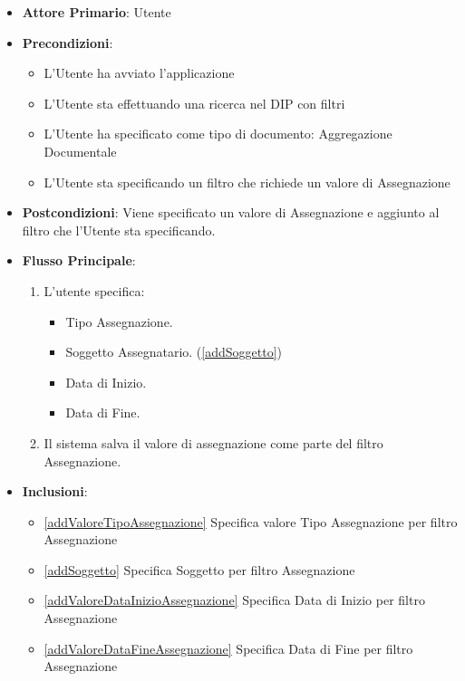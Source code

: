 \begin{itemize}
      \item \textbf{Attore Primario}: Utente
      \item \textbf{Precondizioni}: 
      \begin{itemize}
            \item L'Utente ha avviato l'applicazione
            \item L'Utente sta effettuando una ricerca nel DIP con filtri
            \item L'Utente ha specificato come tipo di documento: Aggregazione Documentale
            \item L'Utente sta specificando un filtro che richiede un valore di Assegnazione
      \end{itemize}
      \item \textbf{Postcondizioni}: Viene specificato un valore di Assegnazione e aggiunto al filtro che l'Utente sta specificando.
      \item \textbf{Flusso Principale}:
      \begin{enumerate}
            \item L'utente specifica:
            \begin{itemize}
                  \item Tipo Assegnazione.
                  \item Soggetto Assegnatario. (\ref{addSoggetto})
                  \item Data di Inizio.
                  \item Data di Fine.
            \end{itemize}
            \item Il sistema salva il valore di assegnazione come parte del filtro Assegnazione.
      \end{enumerate}
      \item \textbf{Inclusioni}: \begin{itemize}
            \item \ref{addValoreTipoAssegnazione} Specifica valore Tipo Assegnazione per filtro Assegnazione
            \item \ref{addSoggetto} Specifica Soggetto per filtro Assegnazione
            \item \ref{addValoreDataInizioAssegnazione} Specifica Data di Inizio per filtro Assegnazione
            \item \ref{addValoreDataFineAssegnazione} Specifica Data di Fine per filtro Assegnazione
      \end{itemize}
\end{itemize}

